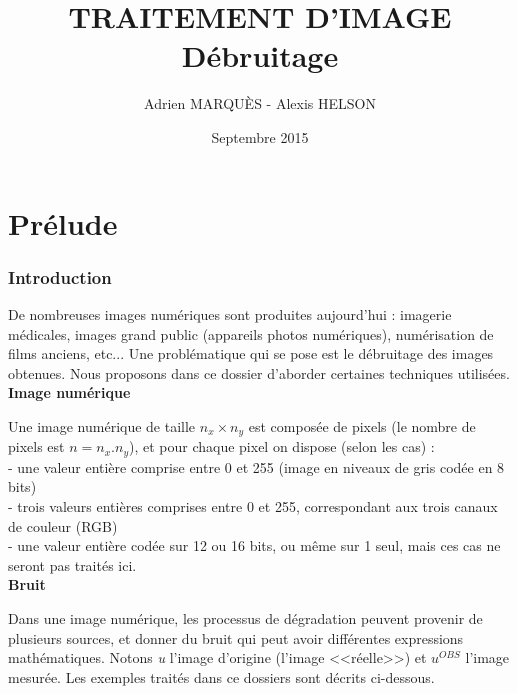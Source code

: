 \documentclass{article}
\title{TRAITEMENT D'IMAGE\\Débruitage}
\author{Adrien MARQUÈS - Alexis HELSON }
\date{Septembre 2015}
\begin{document}
	\maketitle
	
	\part*{Prélude}
		
		\section{Introduction}
			De nombreuses images numériques sont produites aujourd'hui : imagerie médicales, images grand public (appareils photos numériques), numérisation de films anciens, etc... Une problématique qui se pose est le débruitage des images obtenues. Nous proposons dans ce dossier d'aborder certaines techniques utilisées.\\
			\textbf{Image numérique}\par
			Une image numérique de taille \begin{math}n_{x} \times n_{y}\end{math} est composée de pixels (le nombre de pixels est \begin{math}n = n_{x}.n_{y}\end{math}), et pour chaque pixel on dispose (selon les cas) :\\
		 - une valeur entière comprise entre 0 et 255 (image en niveaux de gris codée en 8 bits)\\
		 - trois valeurs entières comprises entre 0 et 255, correspondant aux trois canaux de couleur (RGB)\\
		 - une valeur entière codée sur 12 ou 16 bits, ou même sur 1 seul, mais ces cas ne seront pas traités ici.\\
			\textbf{Bruit}\par
			Dans une image numérique, les processus de dégradation peuvent provenir de plusieurs sources, et donner du bruit qui peut avoir différentes expressions mathématiques. Notons \emph{u} l'image d'origine (l'image <<réelle>>) et \begin{math}u^{OBS}\end{math} l'image mesurée. Les exemples traités dans ce dossiers sont décrits ci-dessous.\par
			\\
\end{document}
